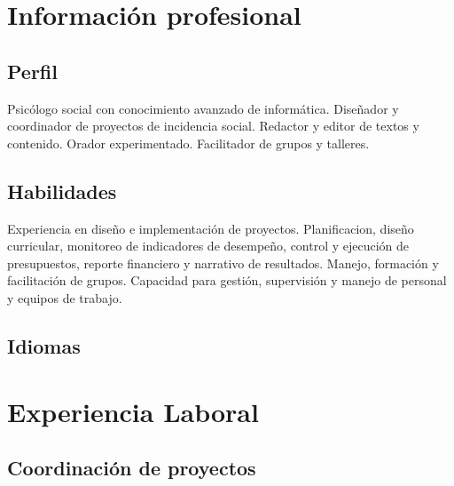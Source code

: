 \documentclass[xcolor=svgnames,color=DarkSlateGray]{komacv}
\begin{document}
\maketitle

\section{Información profesional}
\subsection{Perfil}
\raggedright
  Psicólogo social con conocimiento avanzado de informática. Diseñador y coordinador de proyectos de incidencia social. Redactor y editor de textos y contenido. Orador experimentado. Facilitador de grupos y talleres.
\subsection{Habilidades}
\raggedright
  Experiencia en diseño e implementación de proyectos. Planificacion, diseño curricular, monitoreo de indicadores de desempeño, control y ejecución de presupuestos, reporte financiero y narrativo de resultados. Manejo, formación y facilitación de grupos. Capacidad para gestión, supervisión y manejo de personal y equipos de trabajo.

\subsection{Idiomas}

\section{Experiencia Laboral}
\subsection{Coordinación de proyectos}
\end{document}
